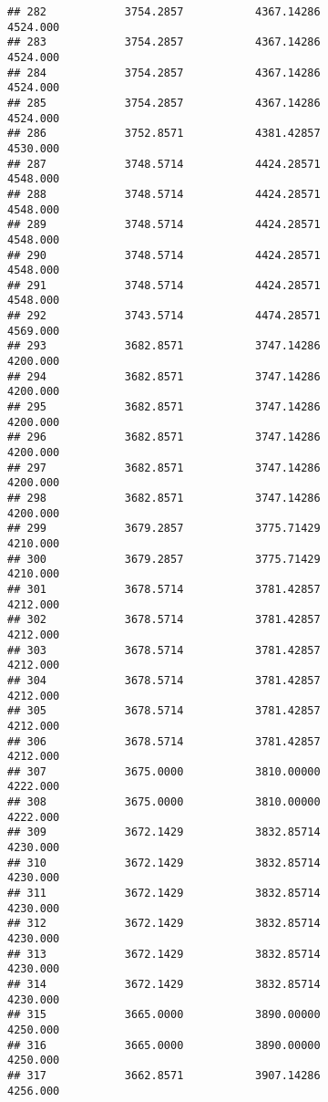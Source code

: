 \documentclass[]{article}
\begin{document}
\begin{verbatim}
## 282            3754.2857           4367.14286                4524.000
## 283            3754.2857           4367.14286                4524.000
## 284            3754.2857           4367.14286                4524.000
## 285            3754.2857           4367.14286                4524.000
## 286            3752.8571           4381.42857                4530.000
## 287            3748.5714           4424.28571                4548.000
## 288            3748.5714           4424.28571                4548.000
## 289            3748.5714           4424.28571                4548.000
## 290            3748.5714           4424.28571                4548.000
## 291            3748.5714           4424.28571                4548.000
## 292            3743.5714           4474.28571                4569.000
## 293            3682.8571           3747.14286                4200.000
## 294            3682.8571           3747.14286                4200.000
## 295            3682.8571           3747.14286                4200.000
## 296            3682.8571           3747.14286                4200.000
## 297            3682.8571           3747.14286                4200.000
## 298            3682.8571           3747.14286                4200.000
## 299            3679.2857           3775.71429                4210.000
## 300            3679.2857           3775.71429                4210.000
## 301            3678.5714           3781.42857                4212.000
## 302            3678.5714           3781.42857                4212.000
## 303            3678.5714           3781.42857                4212.000
## 304            3678.5714           3781.42857                4212.000
## 305            3678.5714           3781.42857                4212.000
## 306            3678.5714           3781.42857                4212.000
## 307            3675.0000           3810.00000                4222.000
## 308            3675.0000           3810.00000                4222.000
## 309            3672.1429           3832.85714                4230.000
## 310            3672.1429           3832.85714                4230.000
## 311            3672.1429           3832.85714                4230.000
## 312            3672.1429           3832.85714                4230.000
## 313            3672.1429           3832.85714                4230.000
## 314            3672.1429           3832.85714                4230.000
## 315            3665.0000           3890.00000                4250.000
## 316            3665.0000           3890.00000                4250.000
## 317            3662.8571           3907.14286                4256.000

\end{verbatim}
\end{document}
